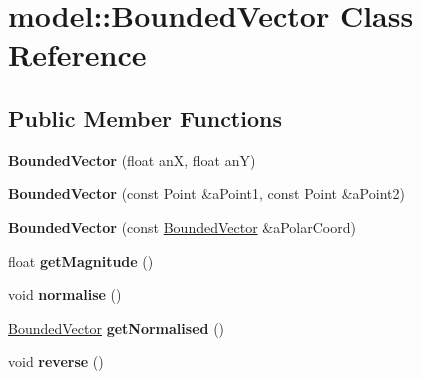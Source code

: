 \hypertarget{class_model_1_1_bounded_vector}{}\section{model\+:\+:Bounded\+Vector Class Reference}
\label{class_model_1_1_bounded_vector}
\subsection*{Public Member Functions}
\begin{DoxyCompactItemize}
\item 
{\bfseries Bounded\+Vector} (float anX, float anY)\hypertarget{class_model_1_1_bounded_vector_a55d60da08dc45930fe4b7db6aca8a55d}{}\label{class_model_1_1_bounded_vector_a55d60da08dc45930fe4b7db6aca8a55d}

\item 
{\bfseries Bounded\+Vector} (const Point \&a\+Point1, const Point \&a\+Point2)\hypertarget{class_model_1_1_bounded_vector_ab769d7fcd9ca402df947e5515c929515}{}\label{class_model_1_1_bounded_vector_ab769d7fcd9ca402df947e5515c929515}

\item 
{\bfseries Bounded\+Vector} (const \hyperlink{class_model_1_1_bounded_vector}{Bounded\+Vector} \&a\+Polar\+Coord)\hypertarget{class_model_1_1_bounded_vector_ab39ae90320b2e9e3f12ef25322620b18}{}\label{class_model_1_1_bounded_vector_ab39ae90320b2e9e3f12ef25322620b18}

\item 
float {\bfseries get\+Magnitude} ()\hypertarget{class_model_1_1_bounded_vector_a9cd9a0c3001c9a717b9fe7c38c4a791a}{}\label{class_model_1_1_bounded_vector_a9cd9a0c3001c9a717b9fe7c38c4a791a}

\item 
void {\bfseries normalise} ()\hypertarget{class_model_1_1_bounded_vector_a063e74d97117138fc2ed5fe7e007f133}{}\label{class_model_1_1_bounded_vector_a063e74d97117138fc2ed5fe7e007f133}

\item 
\hyperlink{class_model_1_1_bounded_vector}{Bounded\+Vector} {\bfseries get\+Normalised} ()\hypertarget{class_model_1_1_bounded_vector_a6a4148a2cf2298951d0b2469c33d799f}{}\label{class_model_1_1_bounded_vector_a6a4148a2cf2298951d0b2469c33d799f}

\item 
void {\bfseries reverse} ()\hypertarget{class_model_1_1_bounded_vector_a29b4dd3c012309ccdb622fab46da50cb}{}\label{class_model_1_1_bounded_vector_a29b4dd3c012309ccdb622fab46da50cb}


\end{DoxyCompactItemize}
